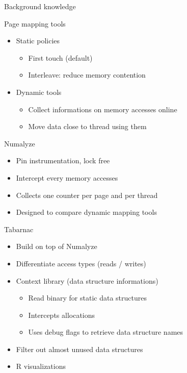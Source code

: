\documentclass[xcolor={usenames,dvipsnames},hyperref={pdfusetitle}]{beamer}
\begin{document}
\begin{frame}{Background knowledge}
    \begin{block}{Page mapping tools}
        \begin{itemize}
            \item  Static policies
                \begin{itemize}
                    \item First touch (default)
                    \item Interleave: reduce memory contention
                \end{itemize}
            \item Dynamic tools~\cite{Corbet12Toward,Diener14kMAF}
                \begin{itemize}
                    \item Collect informations on memory accesses online
                    \item Move data close to thread using them
                \end{itemize}
        \end{itemize}
    \end{block}
    \pause
    \begin{alertblock}{Numalyze~\cite{Diener15Characterizing}}
        \begin{itemize}
            \item Pin instrumentation, lock free
            \item Intercept every memory accesses
            \item Collects one counter per page and per thread
            \item Designed to compare dynamic mapping tools
        \end{itemize}
    \end{alertblock}
\end{frame}

\begin{frame}{Tabarnac}
    \begin{alertblock}{}
        \begin{itemize}
            \item Build on top of Numalyze
            \item Differentiate access types (reads / writes)
            \item Context library (data structure informations)
                \begin{itemize}
                    \item Read binary for static data structures
                    \item Intercepts allocations
                    \item Uses debug flags to retrieve data structure names
                \end{itemize}
            \item Filter out almost unused data structures
            \item R visualizations
        \end{itemize}
    \end{alertblock}
\end{frame}
\end{document}
